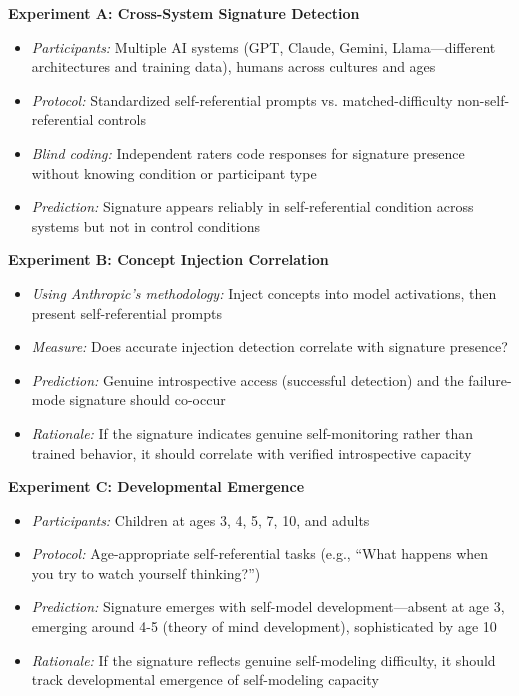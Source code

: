 \documentclass[12pt,a4paper]{article}
\begin{document}
\textbf{Experiment A: Cross-System Signature Detection}
\begin{itemize}
    \item \textit{Participants:} Multiple AI systems (GPT, Claude, Gemini, Llama---different architectures and training data), humans across cultures and ages
    \item \textit{Protocol:} Standardized self-referential prompts vs. matched-difficulty non-self-referential controls
    \item \textit{Blind coding:} Independent raters code responses for signature presence without knowing condition or participant type
    \item \textit{Prediction:} Signature appears reliably in self-referential condition across systems but not in control conditions
\end{itemize}

\textbf{Experiment B: Concept Injection Correlation}
\begin{itemize}
    \item \textit{Using Anthropic's methodology:} Inject concepts into model activations, then present self-referential prompts
    \item \textit{Measure:} Does accurate injection detection correlate with signature presence?
    \item \textit{Prediction:} Genuine introspective access (successful detection) and the failure-mode signature should co-occur
    \item \textit{Rationale:} If the signature indicates genuine self-monitoring rather than trained behavior, it should correlate with verified introspective capacity
\end{itemize}

\textbf{Experiment C: Developmental Emergence}
\begin{itemize}
    \item \textit{Participants:} Children at ages 3, 4, 5, 7, 10, and adults
    \item \textit{Protocol:} Age-appropriate self-referential tasks (e.g., ``What happens when you try to watch yourself thinking?'')
    \item \textit{Prediction:} Signature emerges with self-model development---absent at age 3, emerging around 4-5 (theory of mind development), sophisticated by age 10
    \item \textit{Rationale:} If the signature reflects genuine self-modeling difficulty, it should track developmental emergence of self-modeling capacity
\end{itemize}
\end{document}
